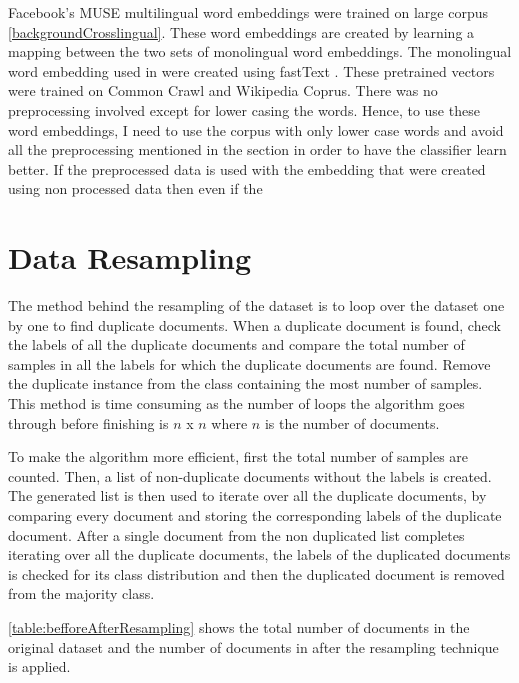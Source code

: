 Facebook's MUSE multilingual word embeddings \cite{conneau2017word} were trained on large corpus \ref{backgroundCrosslingual}. These word embeddings are created by learning a mapping between the two sets of monolingual word embeddings. The monolingual word embedding used in were created using fastText \cite{bojanowski2017enriching}. These pretrained vectors were trained on Common Crawl and Wikipedia Coprus. There was no preprocessing involved except for lower casing the words. Hence, to use these word embeddings, I need to use the corpus with only lower case words and avoid all the preprocessing mentioned in the section in order to have the classifier learn better. If the preprocessed data is used with the embedding that were created using non processed data then even if the 

\fi
\section{Data Resampling} \label{dataResampling}
The method behind the resampling of the dataset is to loop over the dataset one by one to find duplicate documents. When a duplicate document is found, check the labels of all the duplicate documents and compare the total number of samples in all the labels for which the duplicate documents are found. Remove the duplicate instance from the class containing the most number of samples. This method is time consuming as the number of loops the algorithm goes through before finishing is $n$ x $n$ where $n$ is the number of documents.

To make the algorithm more efficient, first the total number of samples are counted. Then, a list of non-duplicate documents without the labels is created. The generated list is then used to iterate over all the duplicate documents, by comparing every document and storing the corresponding labels of the duplicate document. After a single document from the non duplicated list completes iterating over all the duplicate documents, the labels of the duplicated documents is checked for its class distribution and then the duplicated document is removed from the majority class.

\ref{table:befforeAfterResampling} shows the total number of documents in the original dataset and the number of documents in after the resampling technique is applied.

